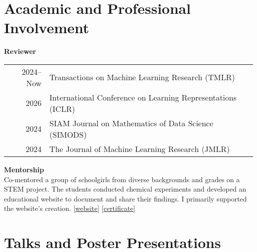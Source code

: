 \documentclass[10pt,a4paper,sans]{moderncv}        %
\begin{document}
\section{Academic and Professional Involvement}

\textbf{Reviewer}\\

\begin{tabular}{@{}r l@{}}
  2024--Now &\quad Transactions on Machine Learning Research (TMLR) \\
  2026      &\quad International Conference on Learning Representations (ICLR) \\
  2024      &\quad SIAM Journal on Mathematics of Data Science (SIMODS) \\
  2024      &\quad The Journal of Machine Learning Research (JMLR) \\
\end{tabular}

\vspace{5pt}

\textbf{Mentorship}\\
Co-mentored a group of schoolgirls from diverse backgrounds and grades on a STEM project. 
The students conducted chemical experiments and developed an educational website to document and share their findings. 
I primarily supported the website's creation.  
[\href{https://artomaranjyan.github.io/cheminno/}{website}] [\textcolor{accent}{\href{https://artomaranjyan.github.io/assets/pdf/feminno_certificate.pdf}{certificate}}]

\vspace{5pt}



\section{Talks and Poster Presentations}


\end{document}
